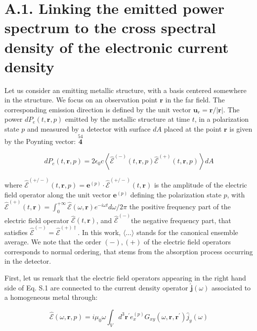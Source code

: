 \documentclass[10pt]{article}
\begin{document}
\section*{A.1. Linking the emitted power spectrum to the cross spectral density of the electronic current density}
Let us consider an emitting metallic structure, with a basis centered somewhere in the structure. We focus on an observation point $\boldsymbol{r}$ in the far field. The corresponding emission direction is defined by the unit vector $\boldsymbol{u}_{r}=\boldsymbol{r} /|\boldsymbol{r}|$. The power $d P_{e}(t, \boldsymbol{r}, p)$ emitted by the metallic structure at time $t$, in a polarization state $p$ and measured by a detector with surface $d A$ placed at the point $\boldsymbol{r}$ is given by the Poynting vector: $\stackrel{54}{\mathbf{4}}$


\begin{equation*}
d P_{e}(t, \boldsymbol{r}, p)=2 \epsilon_{0} c\left\langle\hat{\mathcal{E}}^{(-)}(t, \boldsymbol{r}, p) \hat{\mathcal{E}}^{(+)}(t, \boldsymbol{r}, p)\right\rangle d A \tag{S.1}
\end{equation*}


where $\hat{\mathcal{E}}^{(+/-)}(t, \boldsymbol{r}, p)=\boldsymbol{e}^{(p)} \cdot \hat{\mathcal{E}}^{(+/-)}(t, \boldsymbol{r})$ is the amplitude of the electric field operator along the unit vector $\boldsymbol{e}^{(p)}$ defining the polarization state $p$, with $\hat{\boldsymbol{\mathcal { E }}}^{(+)}(t, \boldsymbol{r})=\int_{0}^{+\infty} \hat{\mathcal{E}}(\omega, \boldsymbol{r}) e^{-i \omega t} d \omega / 2 \pi$ the positive frequency part of the electric field operator $\hat{\mathcal{E}}(t, \boldsymbol{r})$, and $\hat{\mathcal{E}}^{(-)}$the negative frequency part, that satisfies $\hat{\mathcal{E}}^{(-)}=\hat{\mathcal{E}}^{(+) \dagger}$. In this work, $\langle\ldots\rangle$ stands for the canonical ensemble average. We note that the order $(-),(+)$ of the electric field operators corresponds to normal ordering, that stems from the absorption process occurring in the detector.

First, let us remark that the electric field operators appearing in the right hand side of Eq. S.1 are connected to the current density operator $\hat{\boldsymbol{j}}(\omega)$ associated to a homogeneous metal through:


\begin{equation*}
\hat{\mathcal{E}}(\omega, \boldsymbol{r}, p)=i \mu_{0} \omega \int_{V} d^{3} \boldsymbol{r}^{\prime} e_{x}^{(p)} G_{x y}\left(\omega, \boldsymbol{r}, \boldsymbol{r}^{\prime}\right) \hat{j}_{y}(\omega) \tag{S.2}
\end{equation*}
\end{document}
